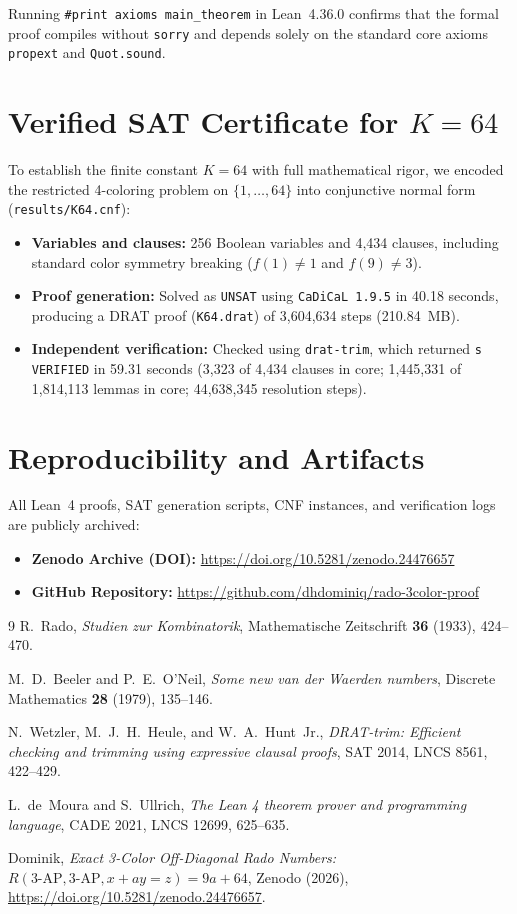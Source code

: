 \documentclass[11pt,a4paper]{article}
\begin{document}
Running \texttt{\#print axioms main\_theorem} in Lean~4.36.0 confirms that the formal proof compiles without \texttt{sorry} and depends solely on the standard core axioms \texttt{propext} and \texttt{Quot.sound}.

\section{Verified SAT Certificate for $K = 64$}

To establish the finite constant $K = 64$ with full mathematical rigor, we encoded the restricted 4-coloring problem on $\{1, \dots, 64\}$ into conjunctive normal form (\texttt{results/K64.cnf}):
\begin{itemize}
    \item \textbf{Variables and clauses:} 256 Boolean variables and 4,434 clauses, including standard color symmetry breaking ($f(1) \neq 1$ and $f(9) \neq 3$).
    \item \textbf{Proof generation:} Solved as \texttt{UNSAT} using \texttt{CaDiCaL 1.9.5} in 40.18 seconds, producing a DRAT proof (\texttt{K64.drat}) of 3,604,634 steps (210.84~MB).
    \item \textbf{Independent verification:} Checked using \texttt{drat-trim}, which returned \texttt{s VERIFIED} in 59.31 seconds (3,323 of 4,434 clauses in core; 1,445,331 of 1,814,113 lemmas in core; 44,638,345 resolution steps).
\end{itemize}

\section{Reproducibility and Artifacts}

All Lean~4 proofs, SAT generation scripts, CNF instances, and verification logs are publicly archived:
\begin{itemize}
    \item \textbf{Zenodo Archive (DOI):} \url{https://doi.org/10.5281/zenodo.24476657}
    \item \textbf{GitHub Repository:} \url{https://github.com/dhdominiq/rado-3color-proof}
\end{itemize}

\begin{thebibliography}{9}
R.~Rado, \emph{Studien zur Kombinatorik}, Mathematische Zeitschrift \textbf{36} (1933), 424--470.

M.~D.~Beeler and P.~E.~O'Neil, \emph{Some new van der Waerden numbers}, Discrete Mathematics \textbf{28} (1979), 135--146.

N.~Wetzler, M.~J.~H.~Heule, and W.~A.~Hunt~Jr., \emph{DRAT-trim: Efficient checking and trimming using expressive clausal proofs}, SAT 2014, LNCS 8561, 422--429.

L.~de~Moura and S.~Ullrich, \emph{The Lean 4 theorem prover and programming language}, CADE 2021, LNCS 12699, 625--635.

Dominik, \emph{Exact 3-Color Off-Diagonal Rado Numbers: $R(\text{3-AP}, \text{3-AP}, x + ay = z) = 9a + 64$}, Zenodo (2026), \url{https://doi.org/10.5281/zenodo.24476657}.
\end{thebibliography}
\end{document}
